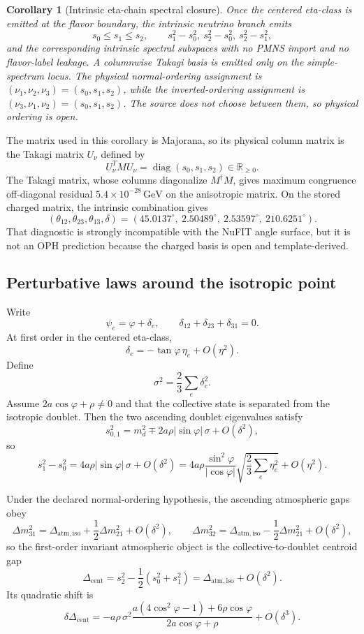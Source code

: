 \documentclass[11pt]{article}
\newtheorem{corollary}[theorem]{Corollary}
\begin{document}
\begin{corollary}[Intrinsic eta-chain spectral closure]
Once the centered eta-class is emitted at the flavor boundary, the intrinsic neutrino branch
emits
\[
s_0\leq s_1\leq s_2,\qquad
s_1^2-s_0^2,\ s_2^2-s_0^2,\ s_2^2-s_1^2,
\]
and the corresponding intrinsic spectral subspaces with no PMNS import and no flavor-label
leakage. A columnwise Takagi basis is emitted only on the simple-spectrum locus. The physical normal-ordering assignment is
\((\nu_1,\nu_2,\nu_3)=(s_0,s_1,s_2)\), while the inverted-ordering assignment is
\((\nu_3,\nu_1,\nu_2)=(s_0,s_1,s_2)\). The source does not choose between them, so
physical ordering is open.
\end{corollary}

The matrix used in this corollary is Majorana, so its physical column matrix is the Takagi matrix
\(U_\nu\) defined by
\[
U_\nu^T M U_\nu=\operatorname{diag}(s_0,s_1,s_2)\in\mathbb R_{\geq0}.
\]
The Takagi matrix, whose columns diagonalize \(M^\dagger M\), gives maximum congruence
off-diagonal residual \(5.4\times10^{-28}\,\mathrm{GeV}\) on the anisotropic matrix. On the
stored charged matrix, the intrinsic combination gives
\[
(\theta_{12},\theta_{23},\theta_{13},\delta)
=(45.0137^\circ,\ 2.50489^\circ,\ 2.53597^\circ,\ 210.6251^\circ).
\]
That diagnostic is strongly incompatible with the NuFIT angle surface, but it is not an OPH
prediction because the charged basis is open and template-derived.

\subsection{Perturbative laws around the isotropic point}

Write
\[
\psi_e=\varphi+\delta_e,
\qquad
\delta_{12}+\delta_{23}+\delta_{31}=0.
\]
At first order in the centered eta-class,
\[
\delta_e=-\tan\varphi\,\eta_e+O(\eta^2).
\]
Define
\[
\sigma^2=\frac23\sum_e \delta_e^2.
\]
Assume \(2a\cos\varphi+\rho\neq0\) and that the collective state is separated from the
isotropic doublet. Then the two ascending doublet eigenvalues satisfy
\[
s_{0,1}^2=m_d^2\mp 2a\rho|\sin\varphi|\,\sigma+O(\delta^2),
\]
so
\[
s_1^2-s_0^2 = 4a\rho|\sin\varphi|\,\sigma+O(\delta^2)
=4a\rho\frac{\sin^2\varphi}{|\cos\varphi|}
\sqrt{\frac23\sum_e\eta_e^2}+O(\eta^2).
\]

Under the declared normal-ordering hypothesis, the ascending atmospheric gaps obey
\[
\Delta m_{31}^2 = \Delta_{\mathrm{atm,iso}} + \frac12\Delta m_{21}^2 + O(\delta^2),
\qquad
\Delta m_{32}^2 = \Delta_{\mathrm{atm,iso}} - \frac12\Delta m_{21}^2 + O(\delta^2),
\]
so the first-order invariant atmospheric object is the collective-to-doublet centroid gap
\[
\Delta_{\mathrm{cent}}=
s_2^2-\frac12(s_0^2+s_1^2)
=
\Delta_{\mathrm{atm,iso}}+O(\delta^2).
\]
Its quadratic shift is
\[
\delta\Delta_{\mathrm{cent}}
=
-
a\rho\,\sigma^2
\frac{a(4\cos^2\varphi-1)+6\rho\cos\varphi}
 {2a\cos\varphi+\rho}
+O(\delta^3).
\]
\end{document}
